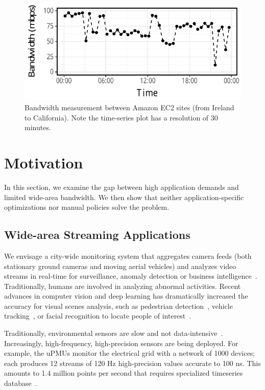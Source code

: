 \begin{figure}
  \centering
  \includegraphics[width=.95\linewidth]{figures/aws-variation.pdf}
  \caption{Bandwidth measurement between Amazon EC2 sites (from Ireland to
    California). Note the time-series plot has a resolution of 30 minutes.}
  \label{fig:bw}
\end{figure}

\section{Motivation}
\label{sec:motivation}

In this section, we examine the gap between high application demands and limited
wide-area bandwidth. We then show that neither application-specific
optimizations nor manual policies solve the problem.

\subsection{Wide-area Streaming Applications}
\label{sec:wide-area-streaming}

 We envisage a city-wide monitoring system that
aggregates camera feeds (both stationary ground cameras and moving aerial
vehicles) and analyzes video streams in real-time for surveillance, anomaly
detection or business intelligence~\cite{oh2011large}. Traditionally, humans are
involved in analyzing abnormal activities. Recent advances in computer vision
and deep learning has dramatically increased the accuracy for visual scenes
analysis, such as pedestrian detection~\cite{dollar2012pedestrian}, vehicle
tracking~\cite{coifman1998real}, or facial recognition to locate people of
interest~\cite{parkhi2015deep, Lu:2015:SHF:2888116.2888245}.

 Traditionally, environmental sensors are slow
and not data-intensive~\cite{atzori2010internet}. Increasingly, high-frequency,
high-precision sensors are being deployed. For example, the uPMUs monitor the
electrical grid with a network of 1000 devices; each produces 12 streams of 120
Hz high-precision values accurate to 100 ns. This amounts to 1.4 million points
per second that requires specialized timeseries
database~\cite{andersen2016btrdb}.

